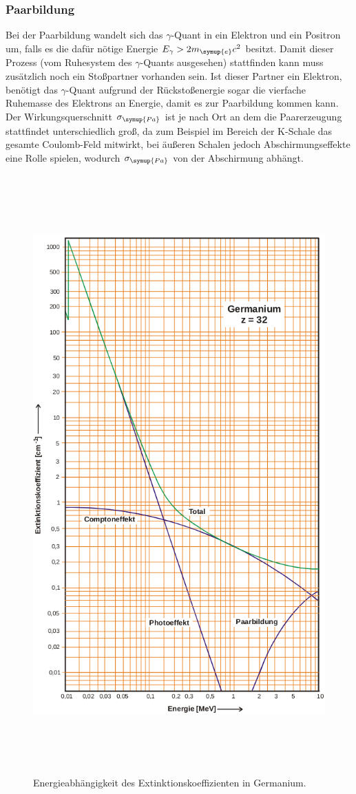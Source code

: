 \subsubsection{Paarbildung}
Bei der Paarbildung wandelt sich das $\gamma$-Quant in ein Elektron und ein Positron um, falls es die dafür nötige Energie $E_{\gamma}>2m_{\symup{e}}c^2$ besitzt.
Damit dieser Prozess (vom Ruhesystem des $\gamma$-Quants ausgesehen) stattfinden kann muss zusätzlich noch ein Stoßpartner vorhanden sein.
Ist dieser Partner ein Elektron, benötigt das $\gamma$-Quant aufgrund der Rückstoßenergie sogar die vierfache Ruhemasse des Elektrons an Energie, damit es zur Paarbildung kommen kann.
Der Wirkungsquerschnitt $\sigma_{\symup{Pa}}$ ist je nach Ort an dem die Paarerzeugung stattfindet unterschiedlich groß, da zum Beispiel im Bereich der K-Schale das gesamte Coulomb-Feld mitwirkt, bei äußeren Schalen
jedoch Abschirmungseffekte eine Rolle spielen, wodurch $\sigma_{\symup{Pa}}$ von der Abschirmung abhängt.
 \begin{figure}
   \centering
   \includegraphics[height=23cm]{content/pictures/Germanium.png}
   \caption{Energieabhängigkeit des Extinktionskoeffizienten in Germanium.\cite{V18}}
   \label{fig:Germanium}
 \end{figure}

